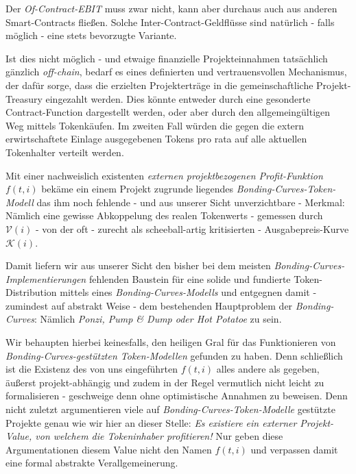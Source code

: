 \vspace{0.3cm}

Der \textit{Of-Contract-EBIT} muss zwar nicht, kann aber durchaus auch aus anderen Smart-Contracts fließen. Solche Inter-Contract-Geldflüsse sind natürlich - falls möglich - eine stets bevorzugte Variante.  

Ist dies nicht möglich - und etwaige finanzielle Projekteinnahmen tatsächlich gänzlich \textit{off-chain}, bedarf es eines definierten und vertrauensvollen Mechanismus, der dafür sorge, dass die erzielten Projekterträge in die gemeinschaftliche Projekt-Treasury eingezahlt werden. Dies könnte entweder durch eine gesonderte Contract-Function dargestellt werden, oder aber durch den allgemeingültigen Weg mittels Tokenkäufen. Im zweiten Fall würden die gegen die extern erwirtschaftete Einlage ausgegebenen Tokens pro rata auf alle aktuellen Tokenhalter verteilt werden.

\vspace{0.2cm}

Mit einer nachweislich existenten \textit{externen projektbezogenen Profit-Funktion} $f(t, i)$ bekäme ein einem Projekt zugrunde liegendes \textit{Bonding-Curves-Token-Modell} das ihm noch fehlende - und aus unserer Sicht unverzichtbare - Merkmal: Nämlich eine gewisse Abkoppelung des realen Tokenwerts - gemessen durch $\mathcal{V} \left( i \right)$ - von der oft - zurecht als scheeball-artig kritisierten - Ausgabepreis-Kurve $\mathcal{K} \left( i \right)$.

Damit liefern wir aus unserer Sicht den bisher bei dem meisten \textit{Bonding-Curves-Implementierungen} fehlenden Baustein für eine solide und fundierte Token-Distribution mittels eines \textit{Bonding-Curves-Modells} und entgegnen damit - zumindest auf abstrakt Weise - dem bestehenden Hauptproblem der \textit{Bonding-Curves}: Nämlich \textit{Ponzi, Pump \& Dump oder Hot Potatoe} zu sein.

\vspace{0.2cm}

Wir behaupten hierbei keinesfalls, den heiligen Gral für das Funktionieren von \textit{Bonding-Curves-gestützten Token-Modellen} gefunden zu haben. Denn schließlich ist die Existenz des von uns eingeführten $f(t, i)$ alles andere als gegeben, äußerst projekt-abhängig und zudem in der Regel vermutlich nicht leicht zu formalisieren - geschweige denn ohne optimistische Annahmen zu beweisen. Denn nicht zuletzt argumentieren viele auf \textit{Bonding-Curves-Token-Modelle} gestützte Projekte genau wie wir hier an dieser Stelle: \textit{Es existiere ein externer Projekt-Value, von welchem die Tokeninhaber profitieren!} Nur geben diese Argumentationen diesem Value nicht den Namen $f(t, i)$ und verpassen damit eine formal abstrakte Verallgemeinerung.

